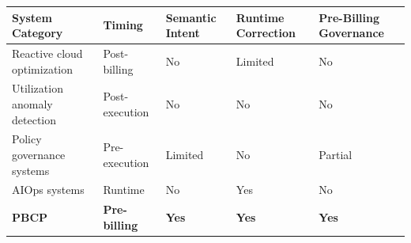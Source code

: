 \begin{tabular}{p{3.4cm}p{2.2cm}p{2.4cm}p{2.3cm}p{2.7cm}}
\toprule
System Category & Timing & Semantic Intent & Runtime Correction & Pre-Billing Governance \\
\midrule
Reactive cloud optimization & Post-billing & No & Limited & No \\
Utilization anomaly detection & Post-execution & No & No & No \\
Policy governance systems & Pre-execution & Limited & No & Partial \\
AIOps systems & Runtime & No & Yes & No \\
\textbf{PBCP} & \textbf{Pre-billing} & \textbf{Yes} & \textbf{Yes} & \textbf{Yes} \\
\bottomrule
\end{tabular}
